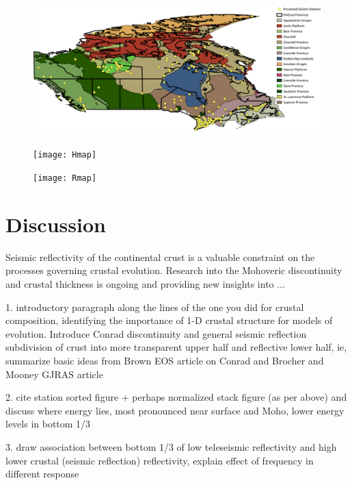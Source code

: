 \documentclass[draft, 12pt]{article}
\begin{document}
\begin{figure}
  \centering
  \includegraphics[width=\textwidth]{stationMap}
  \caption{}
  \label{map:stationMap}
\end{figure}

\begin{figure}
  \centering
  \texttt{[image: Hmap]}
  \caption{}
  \label{map:Hmap}
\end{figure}

\begin{figure}
  \centering
  \texttt{[image: Rmap]}
  \caption{}
  \label{map:Rmap}
\end{figure}



\section{Discussion}

Seismic reflectivity of the continental crust is a valuable constraint on the processes governing crustal evolution. Research into the Mohoveric discontinuity and crustal thickness is ongoing and providing new insights into ...

1. introductory paragraph along the lines of the one you did for crustal composition, identifying the
importance of 1-D crustal structure for models of evolution. Introduce Conrad discontinuity and
general seismic reflection subdivision of crust into more transparent upper half and reflective
lower half, ie, summarize basic ideas from Brown EOS article on Conrad and Brocher and Mooney
GJRAS article

2. cite station sorted figure + perhaps normalized stack figure (as per above) and discuss where
energy lies, most pronounced near surface and Moho, lower energy levels in bottom 1/3

3. draw association between bottom 1/3 of low teleseismic reflectivity and high lower crustal  (seismic
reflection) reflectivity, explain effect of frequency in different response
\end{document}
